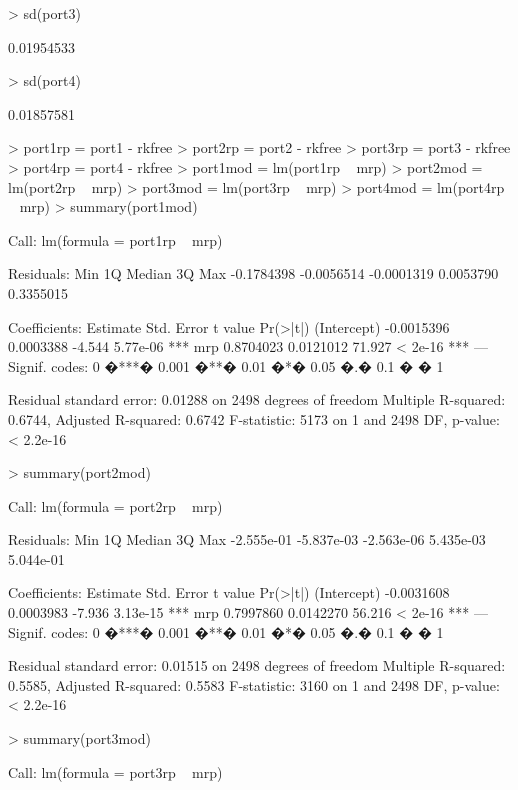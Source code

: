 \documentclass[a4paper]{article}
\begin{document}
\begin{Schunk}
\begin{Sinput}
> sd(port3)
\end{Sinput}
\begin{Soutput}
[1] 0.01954533
\end{Soutput}
\begin{Sinput}
> sd(port4)
\end{Sinput}
\begin{Soutput}
[1] 0.01857581
\end{Soutput}
\begin{Sinput}
> port1rp = port1 - rkfree
> port2rp = port2 - rkfree
> port3rp = port3 - rkfree
> port4rp = port4 - rkfree
> port1mod = lm(port1rp ~ mrp)
> port2mod = lm(port2rp ~ mrp)
> port3mod = lm(port3rp ~ mrp)
> port4mod = lm(port4rp ~ mrp)
> summary(port1mod)
\end{Sinput}
\begin{Soutput}
Call:
lm(formula = port1rp ~ mrp)

Residuals:
       Min         1Q     Median         3Q        Max 
-0.1784398 -0.0056514 -0.0001319  0.0053790  0.3355015 

Coefficients:
              Estimate Std. Error t value Pr(>|t|)    
(Intercept) -0.0015396  0.0003388  -4.544 5.77e-06 ***
mrp          0.8704023  0.0121012  71.927  < 2e-16 ***
---
Signif. codes:  0 �***� 0.001 �**� 0.01 �*� 0.05 �.� 0.1 � � 1 

Residual standard error: 0.01288 on 2498 degrees of freedom
Multiple R-squared: 0.6744,	Adjusted R-squared: 0.6742 
F-statistic:  5173 on 1 and 2498 DF,  p-value: < 2.2e-16 
\end{Soutput}
\begin{Sinput}
> summary(port2mod)
\end{Sinput}
\begin{Soutput}
Call:
lm(formula = port2rp ~ mrp)

Residuals:
       Min         1Q     Median         3Q        Max 
-2.555e-01 -5.837e-03 -2.563e-06  5.435e-03  5.044e-01 

Coefficients:
              Estimate Std. Error t value Pr(>|t|)    
(Intercept) -0.0031608  0.0003983  -7.936 3.13e-15 ***
mrp          0.7997860  0.0142270  56.216  < 2e-16 ***
---
Signif. codes:  0 �***� 0.001 �**� 0.01 �*� 0.05 �.� 0.1 � � 1 

Residual standard error: 0.01515 on 2498 degrees of freedom
Multiple R-squared: 0.5585,	Adjusted R-squared: 0.5583 
F-statistic:  3160 on 1 and 2498 DF,  p-value: < 2.2e-16 
\end{Soutput}
\begin{Sinput}
> summary(port3mod)
\end{Sinput}
\begin{Soutput}
Call:
lm(formula = port3rp ~ mrp)


\end{Soutput}
\end{Schunk}
\end{document}
